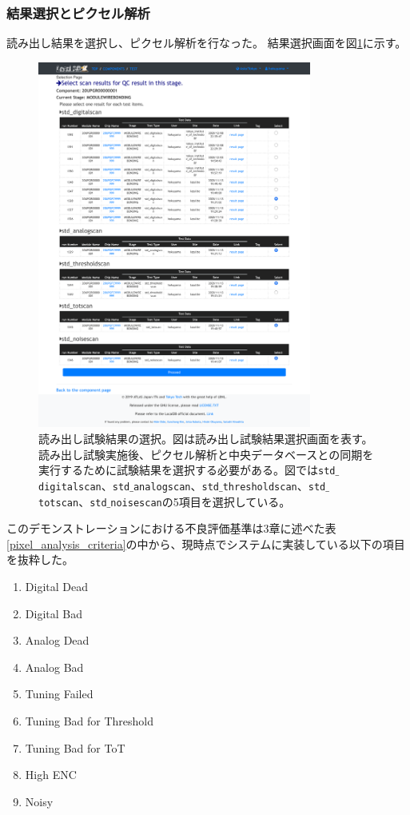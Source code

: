 \clearpage
\subsubsection{結果選択とピクセル解析}
読み出し結果を選択し、ピクセル解析を行なった。
結果選択画面を図\ref{demo_select_scans}に示す。

\begin{figure}[bpt]\centering
  \begin{center}
    \includegraphics[width=9cm]{demo_select_scans}
  \caption[読み出し試験結果の選択]{読み出し試験結果の選択。図は読み出し試験結果選択画面を表す。読み出し試験実施後、ピクセル解析と中央データベースとの同期を実行するために試験結果を選択する必要がある。図では\texttt{std$\_$digitalscan}、\texttt{std$\_$analogscan}、\texttt{std$\_$thresholdscan}、\texttt{std$\_$totscan}、\texttt{std$\_$noisescan}の5項目を選択している。}
  \label{demo_select_scans}
  \end{center}
\end{figure}

このデモンストレーションにおける不良評価基準は3章に述べた表\ref{pixel_analysis_criteria}の中から、現時点でシステムに実装している以下の項目を抜粋した。
\begin{enumerate}
  \item Digital Dead 
  \item Digital Bad 
  \item Analog Dead 
  \item Analog Bad 
  \item Tuning Failed
  \item Tuning Bad for Threshold
  \item Tuning Bad for ToT
  \item High ENC
  \item Noisy
\end{enumerate}

